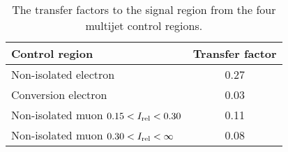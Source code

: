 \begin{table}[h!]
    \centering
    \caption{The transfer factors to the signal region from the four multijet \QCD{} control regions.}
    \label{tb:qcdTF}
    \begin{tabular}{lc}
            \textbf{Control region}     			&	\textbf{Transfer factor} \\
            \hline
            Non-isolated electron					&	0.27 \\
            Conversion electron						&   0.03 \\
            Non-isolated muon $0.15<I_{\mathrm{rel}}<0.30 $ 	& 	0.11 \\
            Non-isolated muon $0.30<I_{\mathrm{rel}}<\infty$ 	& 	0.08 \\
    \end{tabular} \\
\end{table}
